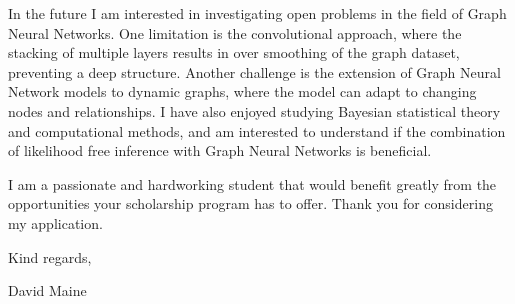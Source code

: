 In the future I am interested in investigating open problems in the field of Graph Neural Networks. One limitation is the convolutional approach, where the stacking of multiple layers results in over smoothing of the graph dataset, preventing a deep structure. Another challenge is the extension of Graph Neural Network models to dynamic graphs, where the model can adapt to changing nodes and relationships. I have also enjoyed studying Bayesian statistical theory and computational methods, and am interested to understand if the combination of likelihood free inference with Graph Neural Networks is beneficial. 
\vspace*{10pt}



I am a passionate and hardworking student that would benefit greatly from the opportunities your scholarship program has to offer. Thank you for considering my application.

\vfill
\noindent
Kind regards,
\vspace*{10pt}

\noindent
David Maine

